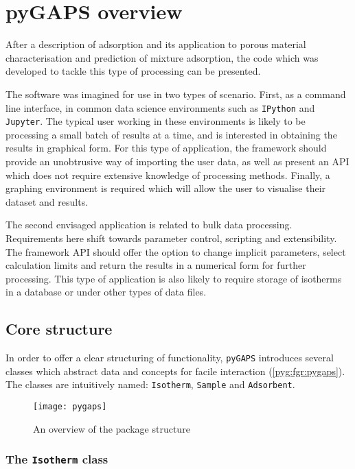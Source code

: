 
\section{pyGAPS overview}

After a description of adsorption and its application to porous
material characterisation and prediction of mixture
adsorption, the code which was developed to tackle this type 
of processing can be presented.

The software was imagined for use in two types of scenario.
First, as a command line interface, in common data science environments
such as \texttt{IPython} and \texttt{Jupyter}. The typical user working
in these environments is likely to be processing a small batch of
results at a time, and is interested in obtaining the results in
graphical form. For this type of application, the framework should
provide an unobtrusive way of importing the user data, as well as
present an API which does not require extensive knowledge of 
processing methods. Finally, a graphing environment is
required which will allow the user to visualise their
dataset and results.

The second envisaged application is related to bulk data processing.
Requirements here shift towards parameter control, scripting and
extensibility. The framework API should offer the option to change 
implicit parameters, select calculation limits and return the results
in a numerical form for further processing. This type of application 
is also likely to require storage of isotherms in a database or
under other types of data files.

\subsection{Core structure}

In order to offer a clear structuring of functionality, 
\texttt{pyGAPS} introduces several classes which abstract data and
concepts for facile interaction (\autoref{pyg:fgr:pygaps}). The classes are
intuitively named: \texttt{Isotherm}, \texttt{Sample} and \texttt{Adsorbent}.

\begin{figure}[htb]
    \centering
    \texttt{[image: pygaps]}%
	\caption{An overview of the package structure}%
\label{pyg:fgr:pygaps}
\end{figure}

\subsubsection{The \texttt{Isotherm} class}

